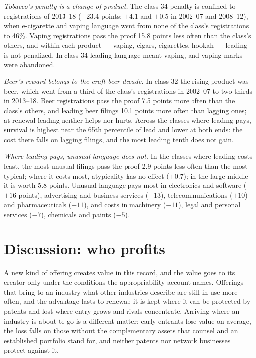 \emph{Tobacco's penalty is a change of product.} The class-34 penalty is
confined to registrations of 2013--18 ($-23.4$ points; $+4.1$ and $+0.5$
in 2002--07 and 2008--12), when e-cigarette and vaping language went from
none of the class's registrations to 46\%. Vaping registrations pass the
proof 15.8 points less often than the class's others, and within each
product --- vaping, cigars, cigarettes, hookah --- leading is not
penalized. In class 34 leading language meant vaping, and vaping marks
were abandoned.

\emph{Beer's reward belongs to the craft-beer decade.} In class 32 the
rising product was beer, which went from a third of the class's
registrations in 2002--07 to two-thirds in 2013--18. Beer registrations
pass the proof 7.5 points more often than the class's others, and leading
beer filings 10.1 points more often than lagging ones; at renewal
leading neither helps nor hurts. Across the classes where leading pays,
survival is highest near the 65th percentile of lead and lower at both
ends: the cost there falls on lagging filings, and the most leading tenth
does not gain.

\emph{Where leading pays, unusual language does not.} In the classes
where leading costs least, the most unusual filings pass the proof 2.9
points less often than the most typical; where it costs most,
atypicality has no effect ($+0.7$); in the large middle it is worth 5.8
points. Unusual language pays most in electronics and software ($+16$
points), advertising and business services ($+13$), telecommunications
($+10$) and pharmaceuticals ($+11$), and costs in machinery ($-11$),
legal and personal services ($-7$), chemicals and paints ($-5$).

\section{Discussion: who profits}\label{sec:discussion}

A new kind of offering creates value in this record, and the value goes
to its creator only under the conditions the appropriability account
names. Offerings that bring to an industry what other industries
describe are still in use more often, and the advantage lasts to
renewal; it is kept where it can be protected by patents and lost where
entry grows and rivals concentrate. Arriving where an industry is about
to go is a different matter: early entrants lose value on average, the
loss falls on those without the complementary assets that counsel and
an established portfolio stand for, and neither patents nor network
businesses protect against it.

